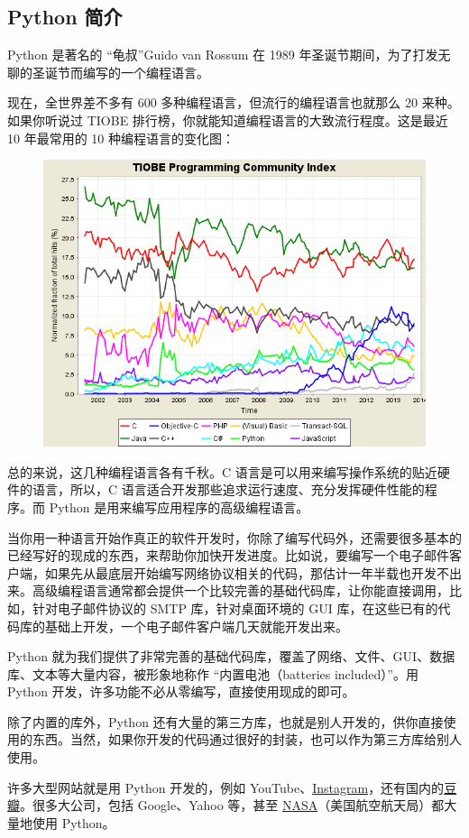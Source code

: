 \hypertarget{python-ux7b80ux4ecb}{%
\subsection{Python 简介}\label{python-ux7b80ux4ecb}}

Python 是著名的 ``龟叔''Guido van Rossum 在 1989
年圣诞节期间，为了打发无聊的圣诞节而编写的一个编程语言。

现在，全世界差不多有 600 多种编程语言，但流行的编程语言也就那么 20
来种。如果你听说过 TIOBE
排行榜，你就能知道编程语言的大致流行程度。这是最近 10 年最常用的 10
种编程语言的变化图：

 
 \begin{figure}[htp]
	\centering
	\includegraphics[width=0.6\linewidth]{fig/9212153960043840.png}
\end{figure}


总的来说，这几种编程语言各有千秋。C
语言是可以用来编写操作系统的贴近硬件的语言，所以，C
语言适合开发那些追求运行速度、充分发挥硬件性能的程序。而 Python
是用来编写应用程序的高级编程语言。

当你用一种语言开始作真正的软件开发时，你除了编写代码外，还需要很多基本的已经写好的现成的东西，来帮助你加快开发进度。比如说，要编写一个电子邮件客户端，如果先从最底层开始编写网络协议相关的代码，那估计一年半载也开发不出来。高级编程语言通常都会提供一个比较完善的基础代码库，让你能直接调用，比如，针对电子邮件协议的
SMTP 库，针对桌面环境的 GUI
库，在这些已有的代码库的基础上开发，一个电子邮件客户端几天就能开发出来。

Python
就为我们提供了非常完善的基础代码库，覆盖了网络、文件、GUI、数据库、文本等大量内容，被形象地称作
``内置电池（batteries included）''。用 Python
开发，许多功能不必从零编写，直接使用现成的即可。

除了内置的库外，Python
还有大量的第三方库，也就是别人开发的，供你直接使用的东西。当然，如果你开发的代码通过很好的封装，也可以作为第三方库给别人使用。

许多大型网站就是用 Python 开发的，例如
YouTube、\href{http://instagram.com/}{Instagram}，还有国内的\href{http://www.douban.com/}{豆瓣}。很多大公司，包括
Google、Yahoo 等，甚至
\href{http://www.nasa.gov/}{NASA}（美国航空航天局）都大量地使用 Python。

